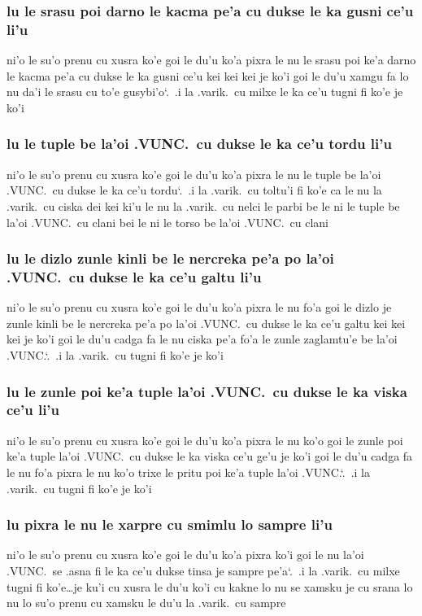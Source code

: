 \documentclass{report}
\newcommand\sds{\spacefactor\sfcode`.\ \space}
\begin{document}
\subsubsection{lu le srasu poi darno le kacma pe'a cu dukse le ka gusni ce'u li'u}
ni'o le su'o prenu cu xusra ko'e goi le du'u ko'a pixra le nu le srasu poi ke'a darno le kacma pe'a cu dukse le ka gusni ce'u kei kei kei je ko'i goi le du'u xamgu fa lo nu da'i le srasu cu to'e gusybi'o\sds  .i la .varik.\ cu milxe le ka ce'u tugni fi ko'e je ko'i

\subsubsection{lu le tuple be la'oi .VUNC.\ cu dukse le ka ce'u tordu li'u}
ni'o le su'o prenu cu xusra ko'e goi le du'u ko'a pixra le nu le tuple be la'oi .VUNC.\ cu dukse le ka ce'u tordu\sds  .i la .varik.\ cu toltu'i fi ko'e ca le nu la .varik.\ cu ciska dei kei ki'u le nu la .varik.\ cu nelci le parbi be le ni le tuple be la'oi .VUNC.\ cu clani bei le ni le torso be la'oi .VUNC.\ cu clani

\subsubsection{lu le dizlo zunle kinli be le nercreka pe'a po la'oi .VUNC.\ cu dukse le ka ce'u galtu li'u}
ni'o le su'o prenu cu xusra ko'e goi le du'u ko'a pixra le nu fo'a goi le dizlo je zunle kinli be le nercreka pe'a po la'oi .VUNC.\ cu dukse le ka ce'u galtu kei kei kei je ko'i goi le du'u cadga fa le nu ciska pe'a fo'a le zunle zaglamtu'e be la'oi .VUNC.\sds  .i la .varik.\ cu tugni fi ko'e je ko'i

\subsubsection{lu le zunle poi ke'a tuple la'oi .VUNC.\ cu dukse le ka viska ce'u li'u}
ni'o le su'o prenu cu xusra ko'e goi le du'u ko'a pixra le nu ko'o goi le zunle poi ke'a tuple la'oi .VUNC.\ cu dukse le ka viska ce'u ge'u je ko'i goi le du'u cadga fa le nu fo'a pixra le nu ko'o trixe le pritu poi ke'a tuple la'oi .VUNC.\sds  .i la .varik.\ cu tugni fi ko'e je ko'i

\subsubsection{lu pixra le nu le xarpre cu smimlu lo sampre li'u}
ni'o le su'o prenu cu xusra ko'e goi le du'u ko'a pixra ko'i goi le nu la'oi .VUNC.\ se .asna fi le ka ce'u dukse tinsa je sampre pe'a\sds  .i la .varik.\ cu milxe tugni fi ko'e\ldots je ku'i cu xusra le du'u ko'i cu kakne lo nu se xamsku je cu srana lo nu lo su'o prenu cu xamsku le du'u la .varik.\ cu sampre
\end{document}
